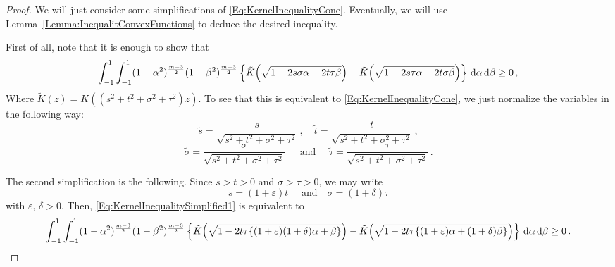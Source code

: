\begin{proof}
We will just consider some simplifications of \eqref{Eq:KernelInequalityCone}. Eventually, we will use Lemma~\ref{Lemma:InequalitConvexFunctions} to deduce the desired inequality.

First of all, note that it is enough to show that
\begin{equation}
\label{Eq:KernelInequalitySimplified1}
\int_{-1}^1  \int_{-1}^1  (1-\alpha^2)^{\frac{m-3}{2}} (1-\beta^2)^{\frac{m-3}{2}}  \left \{\tilde{K}\Big(\sqrt{1 -2 s \sigma \alpha -2 t \tau \beta}\Big) - \tilde{K}\Big(\sqrt{1 -2 s \tau \alpha -2 t \sigma \beta}\Big)  \right \}\,\mathrm{d} \alpha \,\mathrm{d} \beta \geq 0\,,
\end{equation}
Where $\tilde{K}(z) = K((s^2 + t^2 + \sigma^2 + \tau^2)z)$.
To see that this is equivalent to \eqref{Eq:KernelInequalityCone}, we just normalize the variables in the following way:
$$
\tilde{s} = \dfrac{s}{\sqrt{s^2 + t^2 + \sigma^2 + \tau^2}}\,, \quad \tilde{t} = \dfrac{t}{\sqrt{s^2 + t^2 + \sigma^2 + \tau^2}}\,,
$$
$$
\tilde{\sigma} = \dfrac{\sigma}{\sqrt{s^2 + t^2 + \sigma^2 + \tau^2}}\, \quad \textrm{ and } \quad \tilde{\tau} = \dfrac{\tau}{\sqrt{s^2 + t^2 + \sigma^2 + \tau^2}}\,.
$$

The second simplification is the following. Since $s>t>0$ and $\sigma > \tau>0$, we may write
$$
s = (1+\varepsilon) t \quad \textrm{ and} \quad \sigma = (1 + \delta) \tau
$$
with $\varepsilon$, $\delta > 0$. Then, \eqref{Eq:KernelInequalitySimplified1} is equivalent to
\begin{equation}
\label{Eq:KernelInequalitySimplified2}
\int_{-1}^1  \int_{-1}^1  (1-\alpha^2)^{\frac{m-3}{2}} (1-\beta^2)^{\frac{m-3}{2}}  \left \{\tilde{K}\Big(\sqrt{1 -2 t \tau \{(1+\varepsilon)(1+\delta) \alpha + \beta\}}\Big) - \tilde{K}\Big(\sqrt{1 -2 t \tau \{(1+\varepsilon) \alpha + (1+\delta)\beta\}}\Big)  \right \}\,\mathrm{d} \alpha \,\mathrm{d} \beta \geq 0\,.
\end{equation}


\end{proof}
